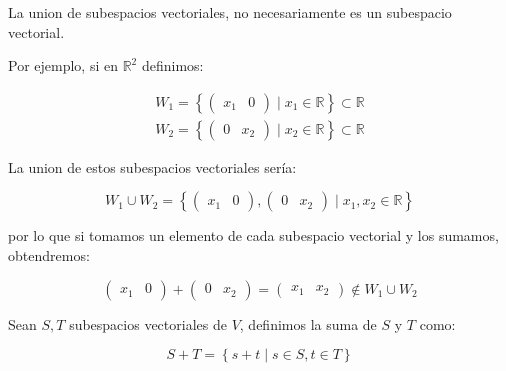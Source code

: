 		\begin{observacion}
			La union de subespacios vectoriales, no necesariamente es un subespacio vectorial.

			Por ejemplo, si en $\mathbb{R}^2$ definimos:

			\begin{eqnarray*}
				W_1 = \left\{ \begin{pmatrix} x_1 & 0 \end{pmatrix} \mid x_1 \in \mathbb{R} \right\} \subset \mathbb{R} \\
				W_2 = \left\{ \begin{pmatrix} 0 & x_2 \end{pmatrix} \mid x_2 \in \mathbb{R} \right\} \subset \mathbb{R}
			\end{eqnarray*}

			La union de estos subespacios vectoriales sería:

			\begin{equation*}
				W_1 \cup W_2 = \left\{ \begin{pmatrix} x_1 & 0 \end{pmatrix}, \begin{pmatrix} 0 & x_2 \end{pmatrix} \mid x_1, x_2 \in \mathbb{R} \right\}
			\end{equation*}

			por lo que si tomamos un elemento de cada subespacio vectorial y los sumamos, obtendremos:

			\begin{equation*}
				\begin{pmatrix} x_1 & 0 \end{pmatrix} + \begin{pmatrix} 0 & x_2 \end{pmatrix} = \begin{pmatrix} x_1 & x_2 \end{pmatrix} \notin W_1 \cup W_2
			\end{equation*}
		\end{observacion}

		\begin{definicion}
			Sean $S, T$ subespacios vectoriales de $V$, definimos la suma de $S$ y $T$ como:

			\begin{equation}
				S + T = \left\{ s + t \mid s \in S, t \in T \right\}
			\end{equation}
		\end{definicion}


